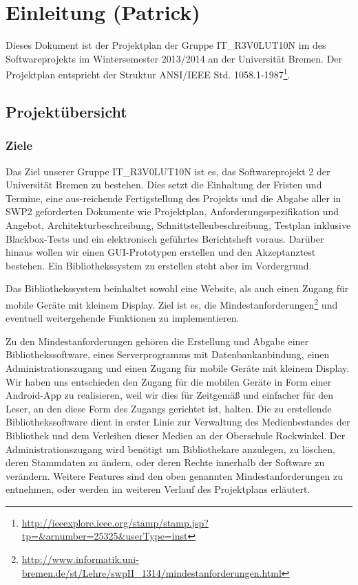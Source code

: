 \documentclass[fontsize=12pt,paper=a4,twoside]{scrartcl}
\begin{document}
\section{Einleitung (Patrick)}

Dieses Dokument ist der Projektplan der Gruppe IT\_R3V0LUT10N im des Softwareprojekts im Wintersemester 2013/2014 an der Universität Bremen. Der Projektplan entspricht der Struktur ANSI/IEEE Std. 1058.1-1987\footnote{\url{http://ieeexplore.ieee.org/stamp/stamp.jsp?tp=&arnumber=25325&userType=inst}}.

\subsection{Projektübersicht}


\subsubsection{Ziele}

Das Ziel unserer Gruppe IT\_R3V0LUT10N ist es, das Softwareprojekt 2 der Universität Bremen zu bestehen. Dies setzt die Einhaltung der Fristen und Termine, eine aus-reichende Fertigstellung des Projekts und die Abgabe aller in SWP2 geforderten Dokumente wie Projektplan, Anforderungsspezifikation und Angebot, Architekturbeschreibung, Schnittstellenbeschreibung, Testplan inklusive Blackbox-Tests und ein elektronisch geführtes Berichtsheft voraus. Darüber hinaus wollen wir einen GUI-Prototypen erstellen und den Akzeptanztest bestehen. Ein Bibliothekssystem zu erstellen steht aber im Vordergrund.

Das Bibliothekssystem beinhaltet sowohl eine Website, als auch einen Zugang für mobile Geräte mit kleinem Display. Ziel ist es, die Mindestanforderungen\footnote{\label{minreq}\url{http://www.informatik.uni-bremen.de/st/Lehre/swpII_1314/mindestanforderungen.html}} und eventuell weitergehende Funktionen zu implementieren.

Zu den Mindestanforderungen gehören die Erstellung und Abgabe einer Bibliothekssoftware, eines Serverprogramms mit Datenbankanbindung, einen Administrationszugang und einen Zugang für mobile Geräte mit kleinem Display. Wir haben uns entschieden den Zugang für die mobilen Geräte in Form einer Android-App zu realisieren, weil wir dies für Zeitgemäß und einfacher für den Leser, an den diese Form des Zugangs gerichtet ist, halten. Die zu erstellende Bibliothekssoftware dient in erster Linie zur Verwaltung des Medienbestandes der Bibliothek und dem Verleihen dieser Medien an der Oberschule Rockwinkel. Der Administrationszugang wird benötigt um Bibliothekare anzulegen, zu löschen, deren Stammdaten zu ändern, oder deren Rechte innerhalb der Software zu verändern. Weitere Features sind den oben genannten Mindestanforderungen zu entnehmen, oder werden im weiteren Verlauf des Projektplans erläutert.
\end{document}
